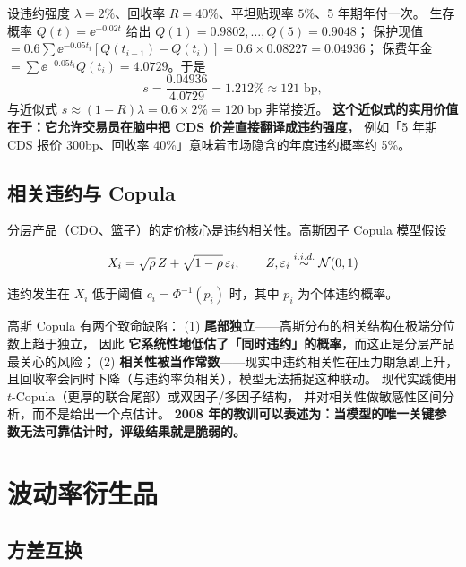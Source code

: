 \begin{example}\label{ex:06-cds}
设违约强度 $\lambda = 2\%$、回收率 $R = 40\%$、平坦贴现率 $5\%$、5 年期年付一次。
生存概率 $Q(t)=\ee^{-0.02t}$ 给出 $Q(1)=0.9802,\dots,Q(5)=0.9048$；
保护现值 $= 0.6\sum \ee^{-0.05t_i}\left[Q(t_{i-1})-Q(t_i)\right] = 0.6\times0.08227 = 0.04936$；
保费年金 $=\sum \ee^{-0.05t_i}Q(t_i) = 4.0729$。于是
\[
  s = \frac{0.04936}{4.0729} = 1.212\% \approx 121 \text{ bp},
\]
与近似式 $s\approx(1-R)\lambda = 0.6\times2\% = 120$ bp 非常接近。
\textbf{这个近似式的实用价值在于：它允许交易员在脑中把 CDS 价差直接翻译成违约强度}，
例如「5 年期 CDS 报价 300bp、回收率 40\%」意味着市场隐含的年度违约概率约 5\%。
\end{example}

\subsection{相关违约与 Copula}

分层产品（CDO、篮子）的定价核心是违约相关性。高斯因子 Copula 模型假设

\begin{equation}
  X_i = \sqrt{\rho}\,Z+\sqrt{1-\rho}\,\varepsilon_i,
  \qquad Z,\varepsilon_i\stackrel{i.i.d.}{\sim}\mathcal{N}(0,1)
  \label{eq:06-gaussian-copula}
\end{equation}

违约发生在 $X_i$ 低于阈值 $c_i = \Phi^{-1}(p_i)$ 时，其中 $p_i$ 为个体违约概率。

\begin{warningbox}
高斯 Copula 有两个致命缺陷：
(1) \textbf{尾部独立}——高斯分布的相关结构在极端分位数上趋于独立，
因此 \textbf{它系统性地低估了「同时违约」的概率}，而这正是分层产品最关心的风险；
(2) \textbf{相关性被当作常数}——现实中违约相关性在压力期急剧上升，
且回收率会同时下降（与违约率负相关），模型无法捕捉这种联动。
现代实践使用 $t$-Copula（更厚的联合尾部）或双因子/多因子结构，
并对相关性做敏感性区间分析，而不是给出一个点估计。
\textbf{2008 年的教训可以表述为：当模型的唯一关键参数无法可靠估计时，评级结果就是脆弱的。}
\end{warningbox}

\section{波动率衍生品}

\subsection{方差互换}

